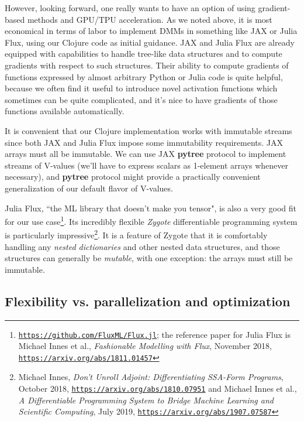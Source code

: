 \documentclass{article}
\begin{document}
However, looking forward, one really wants to have an option of using gradient-based methods and GPU/TPU
acceleration. As we noted above, it is most economical in terms of labor to implement DMMs in something like
JAX or Julia Flux, using our Clojure code as initial guidance. 
JAX and Julia Flux are already equipped with capabilities to handle tree-like data structures and
to compute gradients with respect to such structures. Their ability to compute gradients of functions
expressed by almost arbitrary Python or Julia code is quite helpful, because we often find it useful to introduce
novel activation functions which sometimes can be quite complicated, and it's nice to have
gradients of those functions available automatically. 

It is convenient that our Clojure implementation works with immutable streams since both JAX and Julia
Flux impose some immutability requirements. JAX arrays must all be immutable. We can use JAX {\bf pytree}
protocol to implement streams of V-values (we'll have to express scalars as 1-element arrays whenever necessary),
and {\bf pytree} protocol might provide a practically convenient generalization of our default flavor of V-values.

Julia Flux, ``the ML library that doesn't make you tensor", is also a very good fit
for our use case\footnote{\href{https://github.com/FluxML/Flux.jl}{\tt https://github.com/FluxML/Flux.jl};
the reference paper for Julia Flux is Michael Innes et al., {\em Fashionable Modelling with Flux}, November 2018,
\href{https://arxiv.org/abs/1811.01457}{\tt https://arxiv.org/abs/1811.01457}}. Its incredibly flexible {\em Zygote}
differentiable programming system is particularly impressive\footnote{Michael Innes,
{\em Don't Unroll Adjoint: Differentiating SSA-Form Programs}, October 2018,
\href{https://arxiv.org/abs/1810.07951}{\tt https://arxiv.org/abs/1810.07951} and 
Michael Innes et al., {\em A Differentiable Programming System to Bridge Machine Learning and Scientific Computing}, 
July 2019, \href{https://arxiv.org/abs/1907.07587}{\tt https://arxiv.org/abs/1907.07587}}. It is a
feature of Zygote that it is comfortably handling any {\em nested dictionaries} and other nested data structures,
and those structures can generally be {\em mutable}, with one exception: the arrays must still be immutable.

\subsection{Flexibility vs. parallelization and optimization} 
\end{document}
